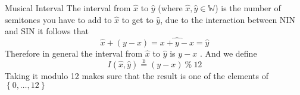 \documentclass{standalone}
\begin{document}
\begin{defn*}{Musical Interval}
  The interval from  $ \widehat{x}$ to $ \widehat{y }$ (where $ \widehat{x}, \widehat{y} \in \mathbb{W}$) is the number of semitones you have to add to $ \widehat{x}$ to get to $ \widehat{y}$, due to the interaction between NIN and SIN it follows that 
  \[
    \widehat{x}  +  \left( y  -  x \right) = \widehat{x  +  y  -  x} = \widehat{y}
  \]
  Therefore in general the interval from $ \widehat{x}$  to $ \widehat{y}$ is $y  - x$ . And we define 
  \[
    I\left( \widehat{x}, \widehat{y}\right) \stackrel{\mathtt{D}}{=} (y  -  x) ~\%~ 12
  \]
  Taking it modulo 12 makes sure that the result is one of the elements of $\left\{ 0 , \ldots, 12 \right\}$ 
\end{defn*}
\end{document}
